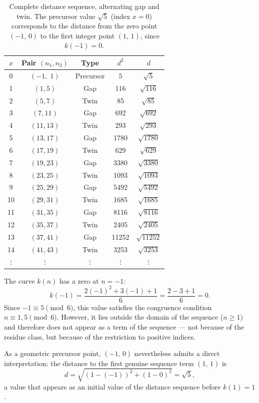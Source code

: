 \begin{table}[H]
\centering
\caption{Complete distance sequence, alternating gap and twin.
  The precursor value $\sqrt{5}$ (index $x=0$) corresponds to the distance
  from the zero point $(-1,\,0)$ to the first integer point $(1,\,1)$,
  since $k(-1) = 0$.}
\renewcommand{\arraystretch}{1.15}
\begin{tabular}{ccccc}
\toprule
$x$ & Pair $(n_1,n_2)$ & Type & $d^2$ & $d$ \\
\midrule
0 & $(-1,\; 1)$ & Precursor & $5$ & $\sqrt{5}$ \\
\midrule
1  & $( 1,  5)$ & Gap  & 116   & $\sqrt{116}$   \\
2  & $( 5,  7)$ & Twin & 85    & $\sqrt{85}$    \\
3  & $( 7, 11)$ & Gap  & 692   & $\sqrt{692}$   \\
4  & $(11, 13)$ & Twin & 293   & $\sqrt{293}$   \\
5  & $(13, 17)$ & Gap  & 1780  & $\sqrt{1780}$  \\
6  & $(17, 19)$ & Twin & 629   & $\sqrt{629}$   \\
7  & $(19, 23)$ & Gap  & 3380  & $\sqrt{3380}$  \\
8  & $(23, 25)$ & Twin & 1093  & $\sqrt{1093}$  \\
9  & $(25, 29)$ & Gap  & 5492  & $\sqrt{5492}$  \\
10 & $(29, 31)$ & Twin & 1685  & $\sqrt{1685}$  \\
11 & $(31, 35)$ & Gap  & 8116  & $\sqrt{8116}$  \\
12 & $(35, 37)$ & Twin & 2405  & $\sqrt{2405}$  \\
13 & $(37, 41)$ & Gap  & 11252 & $\sqrt{11252}$ \\
14 & $(41, 43)$ & Twin & 3253  & $\sqrt{3253}$  \\
$\vdots$ & $\vdots$ & $\vdots$ & $\vdots$ & $\vdots$ \\
\bottomrule
\end{tabular}
\end{table}

\begin{remark}
	The curve $k(n)$ has a zero at $n = -1$:
	\[
	k(-1) = \frac{2(-1)^2 + 3(-1) + 1}{6} = \frac{2 - 3 + 1}{6} = 0.
	\]
	Since $-1 \equiv 5 \pmod{6}$, this value satisfies the congruence condition
	$n \equiv 1, 5 \pmod{6}$. However, it lies outside the
	domain of the sequence ($n \geq 1$) and therefore does not appear
	as a term of the sequence --- not because of the residue class, but because
	of the restriction to positive indices.
	
	As a geometric precursor point, $(-1,\, 0)$ nevertheless admits a
	direct interpretation: the distance to the first genuine sequence term
	$(1,\, 1)$ is
	\[
	d = \sqrt{(1-(-1))^2 + (1-0)^2} = \sqrt{5},
	\]
	a value that appears as an initial value of the distance sequence before
	$k(1) = 1$.
\end{remark}

